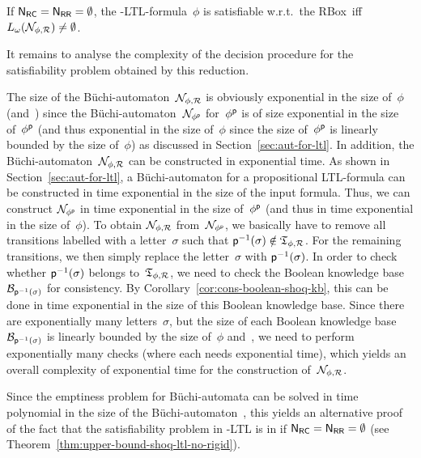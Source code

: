 \begin{corollary}
    If $\mathsf{N_{RC}}=\mathsf{N_{RR}}=\emptyset$, the \SHOQ-LTL-formula~$\phi$ is satisfiable
    w.r.t.\ the RBox~\Rmc iff $L_\omega(\mathcal{N}_{\phi,\mathcal{R}})\ne\emptyset$.
\end{corollary}

\noindent
It remains to analyse the complexity of the decision procedure for the
satisfiability problem obtained by this reduction.

The size of the Büchi-automaton~$\mathcal{N}_{\phi,\mathcal{R}}$ is obviously exponential in
the size of~$\phi$ (and~\Rmc) since the Büchi-automaton~$\mathcal{N}_{\phi^\mathsf{p}}$
for~$\phi^\mathsf{p}$ is of size exponential in the size of~$\phi^\mathsf{p}$ (and thus
exponential in the size of~$\phi$ since the size of~$\phi^\mathsf{p}$ is linearly
bounded by the size of~$\phi$) as discussed in Section~\ref{sec:aut-for-ltl}.
%
In addition, the Büchi-automaton~$\mathcal{N}_{\phi,\mathcal{R}}$ can be constructed in
exponential time.  As shown in Section~\ref{sec:aut-for-ltl}, a Büchi-automaton
for a propositional LTL-formula can be constructed in time exponential in the
size of the input formula.  Thus, we can construct $\mathcal{N}_{\phi^\mathsf{p}}$ in time
exponential in the size of~$\phi^\mathsf{p}$ (and thus in time exponential in the size
of~$\phi$).  To obtain $\mathcal{N}_{\phi,\mathcal{R}}$ from~$\mathcal{N}_{\phi^\mathsf{p}}$, we basically
have to remove all transitions labelled with a letter~$\sigma$ such that
$\mathsf{p}^{-1}(\sigma)\notin\mathfrak{T}_{\phi,\mathcal{R}}$.  For the remaining transitions, we
then simply replace the letter~$\sigma$ with $\mathsf{p}^{-1}(\sigma)$.  In order to
check whether $\mathsf{p}^{-1}(\sigma)$ belongs to~$\mathfrak{T}_{\phi,\mathcal{R}}$, we need to
check the Boolean knowledge base~$\mathcal{B}_{\mathsf{p}^{-1}(\sigma)}$ for consistency.  By
Corollary~\ref{cor:cons-boolean-shoq-kb}, this can be done in time exponential
in the size of this Boolean knowledge base.  Since there are exponentially many
letters~$\sigma$, but the size of each Boolean knowledge
base~$\mathcal{B}_{\mathsf{p}^{-1}(\sigma)}$ is linearly bounded by the size of~$\phi$
and~\Rmc, we need to perform exponentially many checks (where each needs
exponential time), which yields an overall complexity of exponential time for
the construction of~$\mathcal{N}_{\phi,\mathcal{R}}$.

Since the emptiness problem for Büchi-automata can be solved in time polynomial
in the size of the Büchi-automaton~\cite{VaWo-IC94}, this yields an alternative
proof of the fact that the satisfiability problem in \SHOQ-LTL is in \ExpTime if
$\mathsf{N_{RC}}=\mathsf{N_{RR}}=\emptyset$ (see Theorem~\ref{thm:upper-bound-shoq-ltl-no-rigid}).


